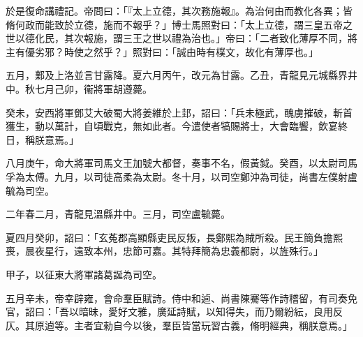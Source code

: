 \begin{pinyinscope}
 
於是復命講禮記。帝問曰：「『太上立德，其次務施報』。為治何由而教化各異；皆脩何政而能致於立德，施而不報乎？」博士馬照對曰：「太上立德，謂三皇五帝之世以德化民，其次報施，謂三王之世以禮為治也。」帝曰：「二者致化薄厚不同，將主有優劣邪？時使之然乎？」照對曰：「誠由時有樸文，故化有薄厚也。」
 
 
 
 
 五月，鄴及上洛並言甘露降。夏六月丙午，改元為甘露。乙丑，青龍見元城縣界井中。秋七月己卯，衞將軍胡遵薨。
 
 
 
 
 癸未，安西將軍鄧艾大破蜀大將姜維於上邽，詔曰：「兵未極武，醜虜摧破，斬首獲生，動以萬計，自頃戰克，無如此者。今遣使者犒賜將士，大會臨饗，飲宴終日，稱朕意焉。」
 
 
 
 
 八月庚午，命大將軍司馬文王加號大都督，奏事不名，假黃鉞。癸酉，以太尉司馬孚為太傅。九月，以司徒高柔為太尉。冬十月，以司空鄭沖為司徒，尚書左僕射盧毓為司空。
 
 
 
 
 二年春二月，青龍見溫縣井中。三月，司空盧毓薨。
 
 
 
 
 夏四月癸卯，詔曰：「玄菟郡高顯縣吏民反叛，長鄭熙為賊所殺。民王簡負擔熙喪，晨夜星行，遠致本州，忠節可嘉。其特拜簡為忠義都尉，以旌殊行。」
 
 
 
 
 甲子，以征東大將軍諸葛誕為司空。
 
 
 
 
 五月辛未，帝幸辟雍，會命羣臣賦詩。侍中和逌、尚書陳騫等作詩稽留，有司奏免官，詔曰：「吾以暗昧，愛好文雅，廣延詩賦，以知得失，而乃爾紛紜，良用反仄。其原逌等。主者宜勑自今以後，羣臣皆當玩習古義，脩明經典，稱朕意焉。」
 
 
 

\end{pinyinscope}
